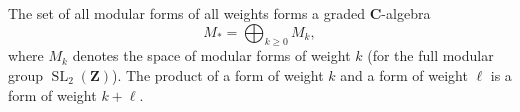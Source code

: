 The set of all modular forms of all weights forms a graded $\mathbf{C}$-algebra
$$
M_* = \bigoplus_{k \geq 0} M_k,
$$
where $M_k$ denotes the space of modular forms of weight $k$ (for the full modular group $\operatorname{SL}_2(\mathbf{Z})$). The product of a form of weight $k$ and a form of weight $\ell$ is a form of weight $k+\ell$.
